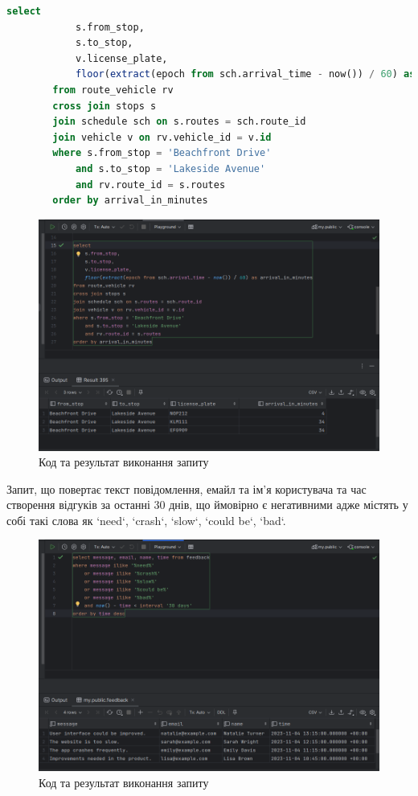 \documentclass[14pt]{extreport}
\begin{document}
\begin{normalsize}
\begin{lstlisting}[language=sql]
		select
			s.from_stop,
			s.to_stop,
			v.license_plate,
			floor(extract(epoch from sch.arrival_time - now()) / 60) as arrival_in_minutes
		from route_vehicle rv
		cross join stops s
		join schedule sch on s.routes = sch.route_id
		join vehicle v on rv.vehicle_id = v.id
		where s.from_stop = 'Beachfront Drive'
			and s.to_stop = 'Lakeside Avenue'
			and rv.route_id = s.routes
		order by arrival_in_minutes
	\end{lstlisting}
	\fi
	\begin{figure}[H]
		\centering
		\includegraphics[scale=0.5]{4}
		\caption{Код та результат виконання запиту}
	\end{figure}
	\pagebreak
	Запит, що повертає текст повідомлення, емайл та ім'я користувача та час створення відгуків за останні 30 днів, що ймовірно є негативними адже містять у собі такі слова як `need`, `crash`, `slow`, `could be`, `bad`.
	

	\begin{figure}[H]
		\centering
		\includegraphics[scale=0.5]{5}
		\caption{Код та результат виконання запиту}
	\end{figure}
	

\end{normalsize}
\end{document}
